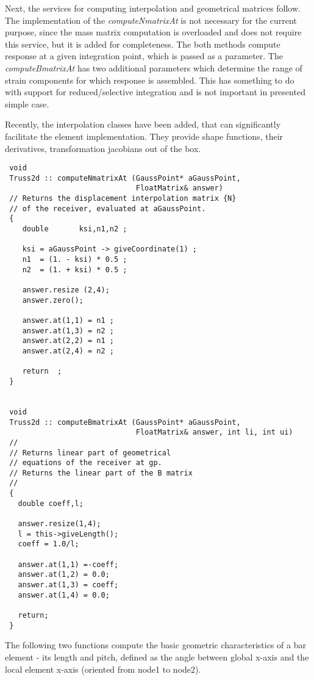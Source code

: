 \documentclass[12pt,draft]{article}
\newcommand{\service}[1]{{\em #1}}
\begin{document}
 Next, the services for computing interpolation and geometrical matrices
 follow. The implementation of the \service{computeNmatrixAt}  is not necessary
 for the current purpose, since the mass matrix computation is overloaded
 and does not require this service, but it is added for completeness.
 The both methods compute response at a given integration point, which is
 passed as a parameter. The \service{computeBmatrixAt} has two additional
 parameters which determine the range of strain components for which
 response is assembled. This has something to do with support for
 reduced/selective integration and is not important in presented simple case.

 Recently, the interpolation classes have been added, that can significantly facilitate the element implementation. They provide shape functions, their derivatives, transformation jacobians out of the box. 
 \begin{verbatim}
 void
 Truss2d :: computeNmatrixAt (GaussPoint* aGaussPoint, 
                              FloatMatrix& answer) 
 // Returns the displacement interpolation matrix {N} 
 // of the receiver, evaluated at aGaussPoint.
 {
    double       ksi,n1,n2 ;

    ksi = aGaussPoint -> giveCoordinate(1) ;
    n1  = (1. - ksi) * 0.5 ;
    n2  = (1. + ksi) * 0.5 ;

    answer.resize (2,4);
    answer.zero();

    answer.at(1,1) = n1 ;
    answer.at(1,3) = n2 ;
    answer.at(2,2) = n1 ;
    answer.at(2,4) = n2 ;

    return  ;
 }


 void
 Truss2d :: computeBmatrixAt (GaussPoint* aGaussPoint, 
                              FloatMatrix& answer, int li, int ui)
 // 
 // Returns linear part of geometrical 
 // equations of the receiver at gp.
 // Returns the linear part of the B matrix
 //
 {
   double coeff,l;

   answer.resize(1,4);
   l = this->giveLength();
   coeff = 1.0/l;

   answer.at(1,1) =-coeff;
   answer.at(1,2) = 0.0;
   answer.at(1,3) = coeff;
   answer.at(1,4) = 0.0;

   return;
 }
 \end{verbatim}

 The following two functions compute the basic geometric
 characteristics of a bar element - its length and pitch, defined as the
 angle between global x-axis and the local element x-axis (oriented
 from node1 to node2).
\end{document}
